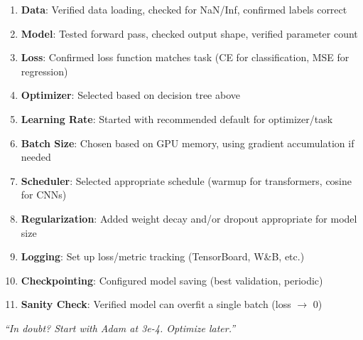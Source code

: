 \documentclass[../main.tex]{subfiles}
\begin{document}
\begin{tcolorbox}[colback=yellow!5, colframe=yellow!50!black, title={\textbf{Pre-Training Checklist}}, fonttitle=\bfseries]
\begin{enumerate}[leftmargin=*, itemsep=3pt]
    \item[$\square$] \textbf{Data}: Verified data loading, checked for NaN/Inf, confirmed labels correct
    \item[$\square$] \textbf{Model}: Tested forward pass, checked output shape, verified parameter count
    \item[$\square$] \textbf{Loss}: Confirmed loss function matches task (CE for classification, MSE for regression)
    \item[$\square$] \textbf{Optimizer}: Selected based on decision tree above
    \item[$\square$] \textbf{Learning Rate}: Started with recommended default for optimizer/task
    \item[$\square$] \textbf{Batch Size}: Chosen based on GPU memory, using gradient accumulation if needed
    \item[$\square$] \textbf{Scheduler}: Selected appropriate schedule (warmup for transformers, cosine for CNNs)
    \item[$\square$] \textbf{Regularization}: Added weight decay and/or dropout appropriate for model size
    \item[$\square$] \textbf{Logging}: Set up loss/metric tracking (TensorBoard, W\&B, etc.)
    \item[$\square$] \textbf{Checkpointing}: Configured model saving (best validation, periodic)
    \item[$\square$] \textbf{Sanity Check}: Verified model can overfit a single batch (loss $\to$ 0)
\end{enumerate}
\end{tcolorbox}

\vspace{0.5cm}

\begin{center}
\textit{``In doubt? Start with Adam at 3e-4. Optimize later.''}
\end{center}
\end{document}
